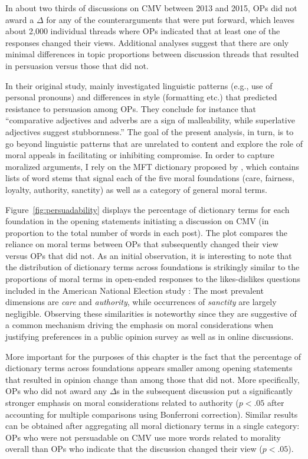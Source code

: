 In about two thirds of discussions on CMV between 2013 and 2015, OPs did not award a $\Delta$ for any of the counterarguments that were put forward, which leaves about 2,000 individual threads where OPs indicated that at least one of the responses changed their views. Additional analyses suggest that there are only minimal differences in topic proportions between discussion threads that resulted in persuasion versus those that did not.

In their original study, \citet{tan2016winning} mainly investigated linguistic patterns (e.g., use of personal pronouns) and differences in style (formatting etc.) that predicted resistance to persuasion among OPs. They conclude for instance that ``comparative adjectives and adverbs are a sign of malleability, while superlative adjectives suggest stubbornness.'' The goal of the present analysis, in turn, is to go beyond linguistic patterns that are unrelated to content and explore the role of moral appeals in facilitating or inhibiting compromise. In order to capture moralized arguments, I rely on the MFT dictionary proposed by \citet{graham2009liberals}, which contains lists of word stems that signal each of the five moral foundations (care, fairness, loyalty, authority, sanctity) as well as a category of general moral terms.

Figure~\ref{fig:persuadability} displays the percentage of dictionary terms for each foundation in the opening statements initiating a discussion on CMV (in proportion to the total number of words in each post). The plot compares the reliance on moral terms between OPs that subsequently changed their view versus OPs that did not. As an initial observation, it is interesting to note that the distribution of dictionary terms across foundations is strikingly similar to the proportions of moral terms in open-ended responses to the likes-dislikes questions included in the American National Election study \citep{kraft2018measuring}: The most prevalent dimensions are \textit{care} and \textit{authority}, while occurrences of \textit{sanctity} are largely negligible. Observing these similarities is noteworthy since they are suggestive of a common mechanism driving the emphasis on moral considerations when justifying preferences in a public opinion survey as well as in online discussions.

More important for the purposes of this chapter is the fact that the percentage of dictionary terms across foundations appears smaller among opening statements that resulted in opinion change than among those that did not. More specifically, OPs who did not award any $\Delta$s in the subsequent discussion put a significantly stronger emphasis on moral considerations related to authority ($p<.05$ after accounting for multiple comparisons using Bonferroni correction). Similar results can be obtained after aggregating all moral dictionary terms in a single category: OPs who were not persuadable on CMV use more words related to morality overall than OPs who indicate that the discussion changed their view ($p<.05$).

